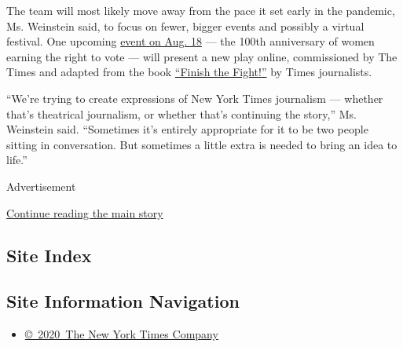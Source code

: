 The team will most likely move away from the pace it set early in the
pandemic, Ms. Weinstein said, to focus on fewer, bigger events and
possibly a virtual festival. One upcoming
\href{https://timesevents.nytimes.com/thejoyofgymlessworkouts}{event on
Aug. 18} --- the 100th anniversary of women earning the right to vote
--- will present a new play online, commissioned by The Times and
adapted from the book
\href{https://www.nytimes.com/2020/07/24/books/finish-the-fight-excerpt.html}{``Finish
the Fight!''} by Times journalists.

``We're trying to create expressions of New York Times journalism ---
whether that's theatrical journalism, or whether that's continuing the
story,'' Ms. Weinstein said. ``Sometimes it's entirely appropriate for
it to be two people sitting in conversation. But sometimes a little
extra is needed to bring an idea to life.''

Advertisement

\protect\hyperlink{after-bottom}{Continue reading the main story}

\hypertarget{site-index}{%
\subsection{Site Index}\label{site-index}}

\hypertarget{site-information-navigation}{%
\subsection{Site Information
Navigation}\label{site-information-navigation}}

\begin{itemize}
\tightlist
\item
  \href{https://help.nytimes.com/hc/en-us/articles/115014792127-Copyright-notice}{©~2020~The
  New York Times Company}
\end{itemize}

